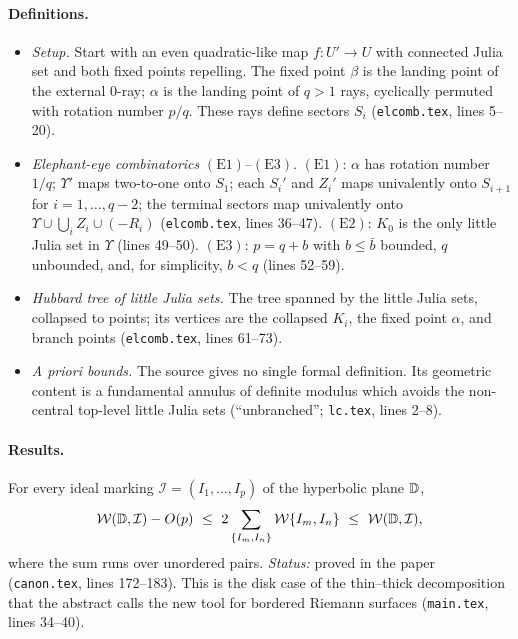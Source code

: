 \paragraph{Definitions.}
\begin{itemize}
\item \emph{Setup.} Start with an even quadratic-like map $f\colon U'\to U$ with connected Julia set
and both fixed points repelling.  The fixed point $\beta$ is the landing point of the external
$0$-ray; $\alpha$ is the landing point of $q>1$ rays, cyclically permuted with rotation number
$p/q$.  These rays define sectors $S_i$ (\texttt{elcomb.tex}, lines 5--20).
\item \emph{Elephant-eye combinatorics} $(\mathrm E1)$--$(\mathrm E3)$.  $(\mathrm E1)$: $\alpha$ has
rotation number $1/q$; $\Upsilon'$ maps two-to-one onto $S_1$; each $S_i'$ and $Z_i'$ maps univalently
onto $S_{i+1}$ for $i=1,\dots,q-2$; the terminal sectors map univalently onto
$\Upsilon\cup\bigcup_iZ_i\cup(-R_i)$ (\texttt{elcomb.tex}, lines 36--47).  $(\mathrm E2)$: $K_0$ is the
only little Julia set in $\Upsilon$ (lines 49--50).  $(\mathrm E3)$: $p=q+b$ with $b\le\bar b$ bounded,
$q$ unbounded, and, for simplicity, $b<q$ (lines 52--59).
\item \emph{Hubbard tree of little Julia sets.}  The tree spanned by the little Julia sets, collapsed to
points; its vertices are the collapsed $K_i$, the fixed point $\alpha$, and branch points
(\texttt{elcomb.tex}, lines 61--73).
\item \emph{A priori bounds.}  The source gives no single formal definition.  Its geometric content is a
fundamental annulus of definite modulus which avoids the non-central top-level little Julia sets
(``unbranched''; \texttt{lc.tex}, lines 2--8).
\end{itemize}

\paragraph{Results.}

\begin{theorem}
\label{thm:kahn-IV-main-estimate}
For every ideal marking $\mathcal I=(I_1,\dots,I_p)$ of the hyperbolic plane $\mathbb D$,
\[
\mathcal W(\D,\mathcal I)-O(p)\ \le\ 2\sum_{\{I_m,I_n\}}\mathcal W\{I_m,I_n\}\ \le\ \mathcal W(\D,\mathcal I),
\]
where the sum runs over unordered pairs.  \emph{Status:} proved in the paper
(\texttt{canon.tex}, lines 172--183).  This is the disk case of the thin--thick decomposition that
the abstract calls the new tool for bordered Riemann surfaces (\texttt{main.tex}, lines 34--40).
\end{theorem}

